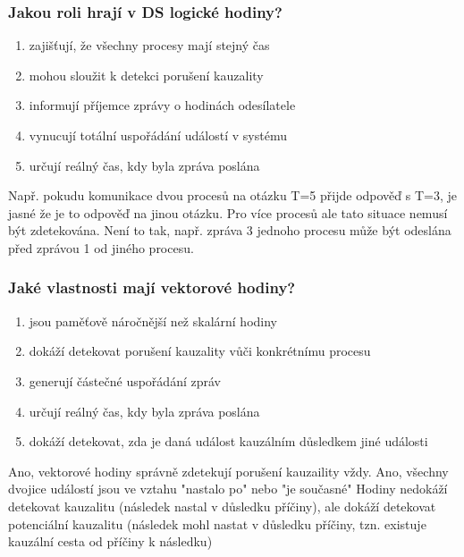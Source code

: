\documentclass[usenames,dvipsnames,9pt]{beamer}
\begin{document}
{
\begin{frame}[fragile]
\frametitle{Jakou roli hrají v DS logické hodiny?}

\begin{enumerate}
\item zajišťují, že všechny procesy mají stejný čas 
\item mohou sloužit k detekci porušení kauzality 
\item informují příjemce zprávy o hodinách odesílatele 
\item vynucují totální uspořádání událostí v systému  
\item určují reálný čas, kdy byla zpráva poslána  
\end{enumerate}

\begin{overprint}[\textwidth]
   Např. pokudu komunikace dvou procesů na otázku T=5 přijde odpověď s T=3, je jasné že je to odpověď na jinou otázku. Pro více procesů ale tato situace nemusí být zdetekována.
   Není to tak, např. zpráva 3 jednoho procesu může být odeslána před zprávou 1 od jiného procesu.
\end{overprint}

\end{frame}

\begin{frame}[fragile]
\frametitle{Jaké vlastnosti mají vektorové hodiny?}

\begin{enumerate}
\item jsou paměťově náročnější než skal\'arn\'i hodiny 
\item dokáží detekovat porušení kauzality vůči konkrétnímu procesu 
\item generují částečné uspořádání zpráv 
\item určují reálný čas, kdy byla zpráva poslána 
\item dokáží detekovat, zda je daná událost kauzálním důsledkem jiné události 
\end{enumerate}

\begin{overprint}[\textwidth]
   Ano, vektorové hodiny správně zdetekují porušení kauzaility vždy.
   Ano, všechny dvojice událostí jsou ve vztahu "nastalo po" nebo "je současné"
   Hodiny nedokáží detekovat kauzalitu (následek nastal v důsledku příčiny), ale dokáží detekovat potenciální kauzalitu (následek mohl nastat v důsledku příčiny, tzn. existuje kauzální cesta od příčiny k následku)
\end{overprint}


\end{frame}
}
\end{document}

